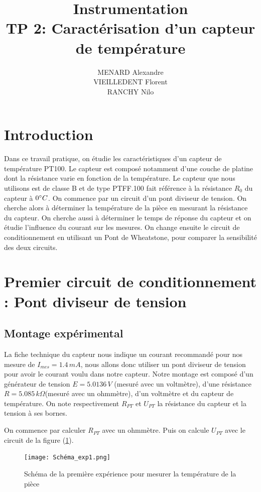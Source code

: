 \documentclass[12pt]{article}
\title{\textbf{Instrumentation} \\ TP 2: Caractérisation d'un capteur de température}
\author{MENARD Alexandre \\ VIEILLEDENT Florent \\ RANCHY Nilo}
\begin{document}
\maketitle

\section*{Introduction}
Dans ce travail pratique, on étudie les caractéristiques d'un capteur de température PT100. Le capteur est composé notamment d'une couche de platine dont la résistance varie en fonction de la température. Le capteur que nous utilisons est de classe B et de type PTFF.100 fait référence à la résistance $R_0$ du capteur à $0\degree C$. On commence par un circuit d'un pont diviseur de tension. On cherche alors à déterminer la température de la pièce en mesurant la résistance du capteur. On cherche aussi à déterminer le temps de réponse du capteur et on étudie l'influence du courant sur les mesures. On change ensuite le circuit de conditionnement en utilisant un Pont de Wheatstone, pour comparer la sensibilité des deux circuits.

\section{Premier circuit de conditionnement : Pont diviseur de tension}
\subsection{Montage expérimental}
La fiche technique du capteur nous indique un courant recommandé pour nos mesure de $I_{mes}=1.4\, mA$, nous allons donc utiliser un pont diviseur de tension pour avoir le courant voulu dans notre capteur. Notre montage est composé d'un générateur de tension $E=5.0136\, V$ (mesuré avec un voltmètre), d'une résistance $R=5.085 \, k\Omega$(mesuré avec un ohmmètre), d'un voltmètre et du capteur de température. On note respectivement $R_{PT}$ et $U_{PT}$ la résistance du capteur et la tension à ses bornes. 

On commence par calculer $R_{PT}$ avec un ohmmètre. Puis on calcule $U_{PT}$ avec le circuit de la figure (\ref{Schéma_exp1}).
\newpage
\begin{figure}[h!]
	\begin{center}
		\texttt{[image: Schéma\_exp1.png]}
		\label{Schéma_exp1}
		\caption{Schéma de la première expérience pour mesurer la température de la pièce}
	\end{center}
\end{figure}
\end{document}

